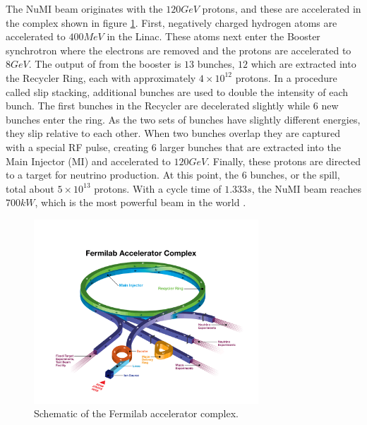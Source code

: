 The NuMI beam originates with the $120\unit{GeV}$ protons, and these are accelerated in the complex shown in figure \ref{fig:FNAL_AC}. First, negatively charged hydrogen atoms are accelerated to $400\unit{MeV}$ in the Linac. These atoms next enter the Booster synchrotron where the electrons are removed and the protons are accelerated to $8\unit{GeV}$. The output of from the booster is $13$ bunches, $12$ which are extracted into the Recycler Ring, each with approximately $4\times10^{12}$ protons. In a procedure called slip stacking, additional bunches are used to double the intensity of each bunch. The first bunches in the Recycler are decelerated slightly while $6$ new bunches enter the ring. As the two sets of bunches have slightly different energies, they slip relative to each other. When two bunches overlap they are captured with a special RF pulse, creating $6$ larger bunches that are extracted into the Main Injector (MI) and accelerated to $120\unit{GeV}$. Finally, these protons are directed to a target for neutrino production. At this point, the 6 bunches, or the spill, total about $5\times10^{13}$ protons. With a cycle time of $1.333\unit{s}$, the NuMI beam reaches $700\unit{kW}$, which is the most powerful beam in the world \cite{ref:TDRNOvA}.
\begin{figure}[htb]
  \centering
  \includegraphics[width=0.75\textwidth]{figures/FNAL_AC.png}
  \caption[Fermilab Accelerator Complex]{Schematic of the Fermilab accelerator complex.}
  \label{fig:FNAL_AC}
\end{figure}

